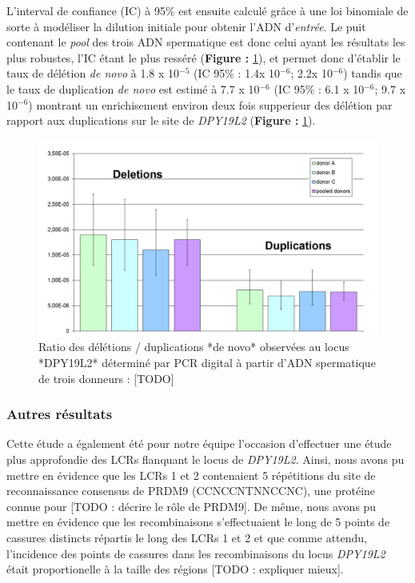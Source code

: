 \documentclass[12pt,twoside]{reedthesis}
\theoremstyle{definition}
\theoremstyle{definition}
\theoremstyle{remark}
\begin{document}
  L'interval de confiance (IC) à 95\% est ensuite calculé grâce à une loi
  binomiale de sorte à modéliser la dilution initiale pour obtenir l'ADN
  d'\emph{entrée}. Le puit contenant le \emph{pool} des trois ADN
  spermatique est donc celui ayant les résultats les plus robustes, l'IC
  étant le plus resséré (\textbf{Figure : }\ref{fig:dupdelrate}), et
  permet donc d'établir le taux de délétion \emph{de novo} à 1.8 x
  10\(^{-5}\) (IC 95\% : 1.4x 10\(^{-6}\); 2.2x 10\(^{-6}\)) tandis que le
  taux de duplication \emph{de novo} est estimé à 7.7 x 10\(^{-6}\) (IC
  95\% : 6.1 x 10\(^{-6}\); 9.7 x 10\(^{-6}\)) montrant un enrichisement
  environ deux fois supperieur des délétion par rapport aux duplications
  sur le site de \emph{DPY19L2} (\textbf{Figure : }\ref{fig:dupdelrate}).
  
  \begin{figure}
  
  {\centering \includegraphics[scale=0.38]{figure/globo_du_del_rate} 
  
  }
  
  \caption[Ratio des délétions / duplications *de novo* observées au locus *DPY19L2* déterminé par PCR digital à partir d'ADN spermatique de trois donneurs]{Ratio des délétions / duplications *de novo* observées au locus *DPY19L2* déterminé par PCR digital à partir d'ADN spermatique de trois donneurs : [TODO]}\label{fig:dupdelrate}
  \end{figure}
  
  \subsubsection{Autres résultats}\label{autres-resultats}
  
  Cette étude a également été pour notre équipe l'occasion d'effectuer une
  étude plus approfondie des LCRs flanquant le locus de \emph{DPY19L2}.
  Ainsi, nous avons pu mettre en évidence que les LCRs 1 et 2 contenaient
  5 répétitions du site de reconnaissance consensus de PRDM9
  (CCNCCNTNNCCNC), une protéine connue pour {[}TODO : décrire le rôle de
  PRDM9{]}. De même, nous avons pu mettre en évidence que les
  recombinaisons s'effectuaient le long de 5 points de cassures distincts
  répartis le long des LCRs 1 et 2 et que comme attendu, l'incidence des
  points de cassures dans les recombinaisons du locus \emph{DPY19L2} était
  proportionelle à la taille des régions {[}TODO : expliquer mieux{]}.
  
\end{document}
